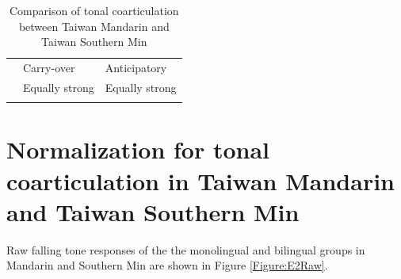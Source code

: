 \begin{flushleft}
\begin{table}[hbt!]
\begin{tabularx}{\textwidth}{l|X|X|}
\cline{2-3}
 & Carry-over & Anticipatory \\
\hhline{~|--}\noalign{\vspace*{\doublerulesep}}
\hhline{-||--}
\multicolumn{1}{|X||}{Taiwan Mandarin} & \multirow{2}{*}{Equally strong} & \multirow{2}{*}{Equally strong}\\
\hhline{|-||~~}
\multicolumn{1}{|X||}{Taiwan Southern Min} &  & \\
\hhline{|-||-|-|}
\end{tabularx}
\caption{Comparison of tonal coarticulation between Taiwan Mandarin and Taiwan Southern Min}
\label{table:MandarinMinDistributionComparison}
\end{table}
\end{flushleft}

\section{Normalization for tonal coarticulation in Taiwan Mandarin and Taiwan Southern Min}
Raw falling tone responses of the the monolingual and bilingual groups in Mandarin and Southern Min are shown in Figure \ref{Figure:E2Raw}.

